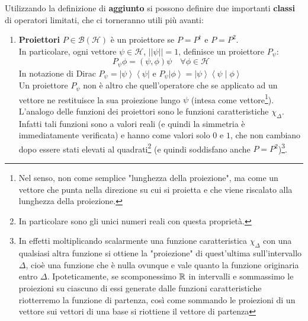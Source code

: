 %

%
Utilizzando la definizione di \textbf{aggiunto} si possono definire due importanti \textbf{classi} di operatori limitati, che ci torneranno utili più avanti:
\begin{enumerate}
    \item \textbf{Proiettori} $P\in\mathcal{B}(\mathcal{H})$ è un proiettore se $P=P^\dag$ e $P=P^2$.\\
    In particolare, ogni vettore $\psi\in\mathcal{H}$, $\left|\left|\psi\right|\right|=1$, definisce un proiettore $P_\psi$:
    \begin{equation}
	P_\psi\phi=\left(\psi,\phi\right)\psi\quad \forall\phi\in\mathcal{H}
	\label{eqn:proiettore}
	\end{equation}
	In notazione di Dirac $P_\psi=\left|\psi\right\rangle\left\langle\psi\right|$ e $P_\psi\left|\phi\right\rangle=\left|\psi\right\rangle\left\langle\psi\middle|\phi\right\rangle$\\
	Un proiettore $P_\psi$ non è altro che quell'operatore che se applicato ad un vettore ne restituisce la sua proiezione lungo $\psi$ (intesa come vettore\footnote{Nel senso, non come semplice "lunghezza della proiezione", ma come un vettore che punta nella direzione su cui si proietta e che viene riscalato alla lunghezza della proiezione.}).\\
	L'analogo delle funzioni dei proiettori sono le funzioni caratteristiche $\chi_\Delta$. Infatti tali funzioni sono a valori reali (e quindi la simmetria è immediatamente verificata) e hanno come valori solo $0$ e $1$, che non cambiano dopo essere stati elevati al quadrati\footnote{In particolare sono gli unici numeri reali con questa proprietà.} (e quindi soddisfano anche $P=P^2$)\footnote{In effetti moltiplicando scalarmente una funzione caratteristica $\chi_\Delta$ con una qualsiasi altra funzione si ottiene la "proiezione" di quest'ultima sull'intervallo $\Delta$, cioè una funzione che è nulla ovunque e vale quanto la funzione originaria entro $\Delta$. Ipoteticamente, se scomponessimo $\mathbb{R}$ in intervalli e sommassimo le proiezioni su ciascuno di essi generate dalle funzioni caratteristiche riotterremo la funzione di partenza, così come sommando le proiezioni di un vettore sui vettori di una base si riottiene il vettore di partenza}.

\end{enumerate}
